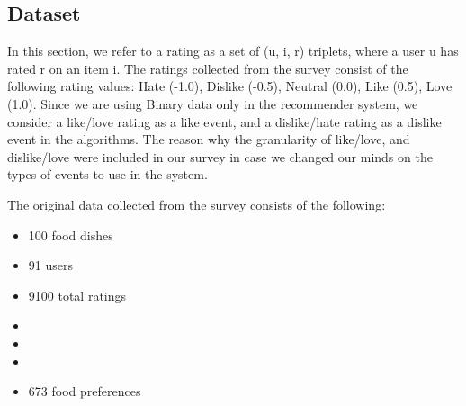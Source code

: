 \subsection{Dataset}
In this section, we refer to a rating as a set of (u, i, r) triplets, where a user u has rated r on an item i. 
The ratings collected from the survey consist of the following rating values: Hate (-1.0), Dislike (-0.5), Neutral (0.0), Like (0.5), Love (1.0). Since we are using Binary data only in the recommender system, we consider a like/love rating as a like event, and a dislike/hate rating as a dislike event in the algorithms. The reason why the granularity of like/love, and dislike/love were included in our survey in case we changed our minds on the types of events to use in the system.

The original data collected from the survey consists of the following:
\begin{itemize}
	\item{100 food dishes}
	\item{91 users}
	\item{9100 total ratings}
	\item{} 
	\item{}
	\item{}
	\item{673 food preferences}
\end{itemize}

% 



